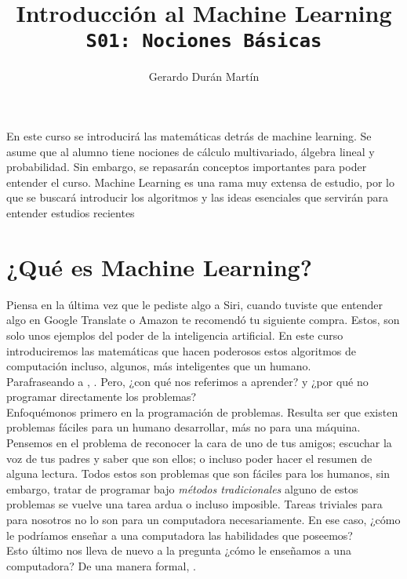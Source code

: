 \documentclass[11pt]{article}
\title{Introducción al Machine Learning \\ \large \texttt{S01: Nociones Básicas}}
\author{Gerardo Durán Martín}
\begin{document}
\maketitle

\newcommand{\Rnums}{\mathbb{R}}

En este curso se introducirá las matemáticas detrás de machine learning. Se asume que al alumno tiene nociones de cálculo multivariado, álgebra lineal y probabilidad. Sin embargo, se repasarán conceptos importantes para poder entender el curso. Machine Learning es una rama muy extensa de estudio, por lo que se buscará introducir los algoritmos y las ideas esenciales que servirán para entender estudios recientes 

\section{¿Qué es Machine Learning?}

Piensa en la última vez que le pediste algo a Siri, cuando tuviste que entender algo en Google Translate o Amazon te recomendó tu siguiente compra. Estos, son solo unos ejemplos del poder de la inteligencia artificial. En este curso introduciremos las matemáticas que hacen poderosos estos algoritmos de computación incluso, algunos, más inteligentes que un humano.\\

Parafraseando a \cite{samuel}, . Pero, ¿con qué nos referimos a aprender? y ¿por qué no programar directamente los problemas?\\

Enfoquémonos primero en la programación de problemas. Resulta ser que existen problemas fáciles para un humano desarrollar, más no para una máquina. Pensemos en el problema de reconocer la cara de uno de tus amigos; escuchar la voz de tus padres y saber que son ellos; o incluso poder hacer el resumen de alguna lectura. Todos estos son problemas que son fáciles para los humanos, sin embargo, tratar de programar bajo \textit{métodos tradicionales} alguno de estos problemas se vuelve una tarea ardua o incluso imposible. Tareas triviales para para nosotros no lo son para un computadora necesariamente. En ese caso, ¿cómo le podríamos enseñar a una computadora las habilidades que poseemos?\\

Esto último nos lleva de nuevo a la pregunta ¿cómo le enseñamos a una computadora? De una manera formal, \cite{Mitchell}. \\
\end{document}
